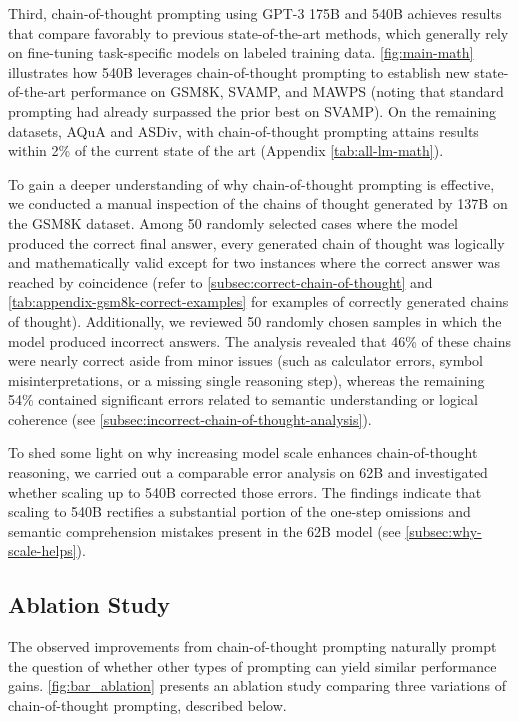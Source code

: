 Third, chain-of-thought prompting using GPT-3 175B and \palm{} 540B achieves results that compare favorably to previous state-of-the-art methods, which generally rely on fine-tuning task-specific models on labeled training data. \cref{fig:main-math} illustrates how \palm{} 540B leverages chain-of-thought prompting to establish new state-of-the-art performance on GSM8K, SVAMP, and MAWPS (noting that standard prompting had already surpassed the prior best on SVAMP). On the remaining datasets, AQuA and ASDiv, \palm{} with chain-of-thought prompting attains results within 2\% of the current state of the art (Appendix \cref{tab:all-lm-math}).

To gain a deeper understanding of why chain-of-thought prompting is effective, we conducted a manual inspection of the chains of thought generated by \lamda{} 137B on the GSM8K dataset. Among 50 randomly selected cases where the model produced the correct final answer, every generated chain of thought was logically and mathematically valid except for two instances where the correct answer was reached by coincidence (refer to \cref{subsec:correct-chain-of-thought} and \cref{tab:appendix-gsm8k-correct-examples} for examples of correctly generated chains of thought). Additionally, we reviewed 50 randomly chosen samples in which the model produced incorrect answers. The analysis revealed that 46\% of these chains were nearly correct aside from minor issues (such as calculator errors, symbol misinterpretations, or a missing single reasoning step), whereas the remaining 54\% contained significant errors related to semantic understanding or logical coherence (see \cref{subsec:incorrect-chain-of-thought-analysis}). 

To shed some light on why increasing model scale enhances chain-of-thought reasoning, we carried out a comparable error analysis on \palm{} 62B and investigated whether scaling up to \palm{} 540B corrected those errors. The findings indicate that scaling \palm{} to 540B rectifies a substantial portion of the one-step omissions and semantic comprehension mistakes present in the 62B model (see \cref{subsec:why-scale-helps}).

\subsection{Ablation Study}\label{subsec:math-ablation}

The observed improvements from chain-of-thought prompting naturally prompt the question of whether other types of prompting can yield similar performance gains. \cref{fig:bar_ablation} presents an ablation study comparing three variations of chain-of-thought prompting, described below.

